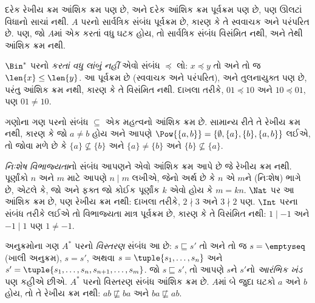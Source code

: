 \begin{ex}
દરેક રેખીય ક્રમ આંશિક ક્રમ પણ છે, અને દરેક આંશિક ક્રમ
પૂર્વક્રમ પણ છે, પણ ઊલટાં વિધાનો સાચાં નથી.
$A$ પરનો સાર્વત્રિક સંબંધ પૂર્વક્રમ છે, કારણ કે તે સ્વવાચક
અને પરંપરિત છે. પણ, જો $A$માં એક કરતાં વધુ ઘટક
હોય, તો સાર્વત્રિક સંબંધ વિસંમિત નથી, અને તેથી આંશિક ક્રમ નથી.
\end{ex}

\begin{ex}
$\Bin^*$ પરનો \emph{કરતાં વધુ લાંબું નહીં} એવો સંબંધ
$\preccurlyeq$ લો: $x \preccurlyeq y$ તો અને તો જ
$\len{x} \le \len{y}$. આ પૂર્વક્રમ છે (સ્વવાચક અને પરંપરિત),
અને તુલનાયુક્ત પણ છે, પરંતુ આંશિક ક્રમ નથી,
કારણ કે તે વિસંમિત નથી. દાખલા તરીકે,
$01 \preccurlyeq 10$ અને $10 \preccurlyeq 01$,
પણ $01 \neq 10$.
\end{ex}

\begin{ex}
ગણોના ગણ પરનો સંબંધ $\subseteq$ એક મહત્વનો આંશિક ક્રમ છે.
સામાન્ય રીતે તે રેખીય ક્રમ નથી, કારણ કે જો $a \neq b$ હોય
અને આપણે $\Pow{\{a, b\}} = \{\emptyset, \{a\}, \{b\}, \{a,b\}\}$
લઈએ, તો જોવા મળે છે કે $\{a\} \nsubseteq \{b\}$ અને
$\{a\} \neq \{b\}$ અને $\{b\} \nsubseteq \{a\}$.
\end{ex}

\begin{ex}
\emph{નિઃશેષ વિભાજ્યતા}નો સંબંધ આપણને એવો આંશિક ક્રમ આપે છે
જે રેખીય ક્રમ નથી. પૂર્ણાંકો $n$ અને $m$ માટે આપણે $n \mid m$
લખીએ, જેનો અર્થ છે કે $n$ એ $m$ને (નિઃશેષ) ભાગે છે,
એટલે કે, જો અને ફક્ત જો કોઈક પૂર્ણાંક $k$ એવો હોય કે
$m = kn$. $\Nat$ પર આ આંશિક ક્રમ છે, પણ રેખીય ક્રમ નથી:
દાખલા તરીકે, $2 \nmid 3$ અને $3 \nmid 2$ પણ.
$\Int$ પરના સંબંધ તરીકે લઈએ તો વિભાજ્યતા માત્ર પૂર્વક્રમ છે,
કારણ કે તે વિસંમિત નથી: $1 \mid -1$ અને $-1 \mid 1$
પણ $1 \neq -1$.
\end{ex}

\begin{ex}
અનુક્રમોના ગણ $A^*$ પરનો \emph{વિસ્તરણ} સંબંધ આ છે:
$s \sqsubseteq s'$ તો અને તો જ $s = \emptyseq$ (ખાલી અનુક્રમ),
$s = s'$, અથવા $s = \tuple{s_1, \dots, s_n}$ અને
$s' = \tuple{s_1, \dots, s_n, s_{n+1}, \dots, s_m}$.
જો $s \sqsubseteq s'$, તો આપણે $s$ને $s'$નો
\emph{આરંભિક ખંડ} પણ કહીએ છીએ.
$A^*$ પરનો વિસ્તરણ સંબંધ આંશિક ક્રમ છે. $A$માં બે જુદા
ઘટકો $a$ અને $b$ હોય, તો તે રેખીય ક્રમ નથી:
$ab \not\sqsubseteq ba$ અને $ba \not\sqsubseteq ab$.
\end{ex}

